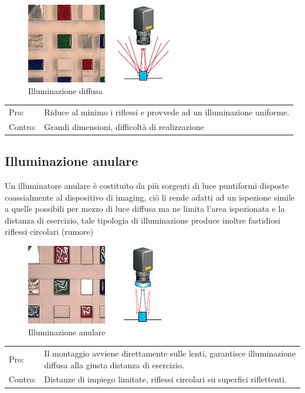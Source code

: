 \begin{figure}
\centering
\includegraphics[width=.3\textwidth]{img/illuminazione-diffusa.jpg}
\caption{Illuminazione diffusa}\label{fig:illuminazione-diffusa}
\end{figure}


\begin{centering}
\centering
\begin{tabular}{l l}
Pro: &  Riduce al minimo i riflessi e provvede ad un illuminazione uniforme. \\
Contro: &  Grandi dimensioni, difficoltà di realizzazione \\
\end{tabular}
\end{centering}

\subsection{Illuminazione anulare}
Un illuminatore anulare è costituito da più sorgenti di luce 
puntiformi disposte coassialmente al dispositivo di 
imaging, ciò li rende adatti ad un ispezione simile a quelle 
possibili per mezzo di luce diffusa ma ne limita l’area 
ispezionata e la distanza di esercizio, tale tipologia di 
illuminazione produce inoltre fastidiosi riflessi circolari 
(rumore) 
 


\begin{figure}[h]
\centering
\includegraphics[width=.3\textwidth]{img/illuminazione-anulare.jpg}
\caption{Illuminazione anulare}\label{fig:illuminazione-anulare}
\end{figure}

\begin{centering}
\centering
\begin{tabularx}{\textwidth}{l p{}}
Pro: &  Il montaggio avviene direttamente sulle lenti, garantisce illuminazione diffusa alla giusta distanza di esercizio. \\
Contro: &  Distanze di impiego limitate, riflessi circolari su superfici riflettenti.\\
\end{tabularx}
\end{centering}

